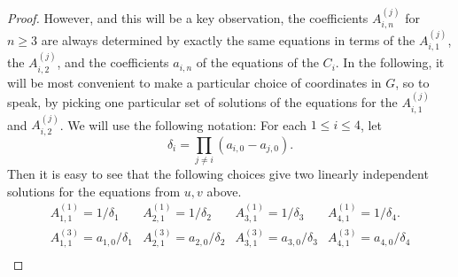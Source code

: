 \documentclass[12pt]{amsart}
\theoremstyle{theorem}
\begin{document}
\begin{proof}
However, and this will be a key observation, the coefficients $A_{i,n}^{(j)}$ for $n \ge 3$ are always determined by exactly the same
equations in terms of the $A_{i,1}^{(j)}$, the $A_{i,2}^{(j)}$, and the coefficients $a_{i,n}$ of the equations of the $C_i$.  
In the following, it will be most convenient to make a particular choice of coordinates in $G$, so to speak, by picking one particular set of 
solutions of the equations for the $A_{i,1}^{(j)}$ and $A_{i,2}^{(j)}$.  
We will use the following notation:  For each $1 \le i \le 4$, let 
\begin{equation}
\label{deltai}
\delta_i = \prod_{j\ne i} (a_{i,0} - a_{j,0}).
\end{equation}
Then it is easy to see that the following choices give two linearly independent solutions for the equations from $u,v$ above.
\begin{equation}
\begin{matrix}
\label{Ai1s13}
A_{1,1}^{(1)} = 1/\delta_1 & A_{2,1}^{(1)}  = 1/\delta_2 &  A_{3,1}^{(1)}  = 1/\delta_3 & A_{4,1}^{(1)}  = 1/\delta_4.\\
A_{1,1}^{(3)}  = a_{1,0}/\delta_1 & A_{2,1}^{(3)} = a_{2,0}/\delta_2 &  A_{3,1}^{(3)} = a_{3,0}/\delta_3 & A_{4,1}^{(3)} = a_{4,0}/\delta_4\\
\end{matrix}
\end{equation}


\end{proof}
\end{document}
